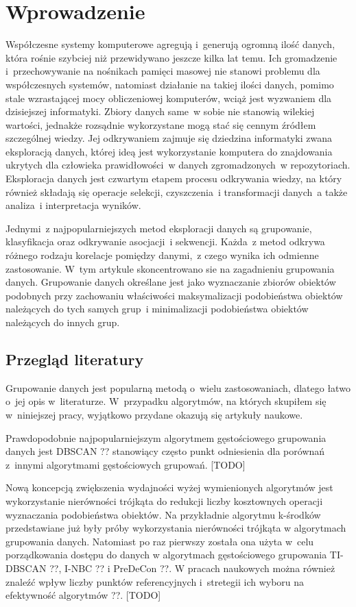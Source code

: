 \chapter{Wprowadzenie}

Współczesne systemy komputerowe agregują i~generują ogromną ilość danych, która rośnie szybciej niż przewidywano jeszcze kilka lat temu. Ich gromadzenie i~przechowywanie na nośnikach pamięci masowej nie stanowi problemu dla współczesnych systemów, natomiast działanie na takiej ilości danych, pomimo stale wzrastającej mocy obliczeniowej komputerów, wciąż jest wyzwaniem dla dzisiejszej informatyki. Zbiory danych same~w sobie nie stanowią wilekiej wartości, jednakże rozsądnie wykorzystane mogą stać się cennym źródłem szczególnej wiedzy. Jej odkrywaniem zajmuje się dziedzina informatyki zwana eksploracją danych, której ideą jest wykorzystanie komputera do znajdowania ukrytych dla człowieka prawidłowości~w danych zgromadzonych~w repozytoriach. Eksploracja danych jest czwartym etapem procesu odkrywania wiedzy, na który również składają się operacje selekcji, czyszczenia~i transformacji danych~a także analiza~i interpretacja wyników.

Jednymi~z najpopularniejszych metod eksploracji danych są grupowanie, klasyfikacja oraz odkrywanie asocjacji~i sekwencji. Każda~z metod odkrywa różnego rodzaju korelacje pomiędzy danymi,~z czego wynika ich odmienne zastosowanie. W~tym artykule skoncentrowano sie na zagadnieniu grupowania danych. Grupowanie danych określane jest jako wyznaczanie zbiorów obiektów podobnych przy zachowaniu właściwości maksymalizacji podobieństwa obiektów należących do tych samych grup~i minimalizacji podobieństwa obiektów należących do innych grup.

\section[Przegląd literatury][Przegląd literatury]{Przegląd literatury}

Grupowanie danych jest popularną metodą o~wielu zastosowaniach, dlatego łatwo o~jej opis w~literaturze. W~przypadku algorytmów, na których skupiłem się w~niniejszej pracy, wyjątkowo przydane okazują się artykuły naukowe.

Prawdopodobnie najpopularniejszym algorytmem gęstościowego grupowania danych jest DBSCAN ?? stanowiący często punkt odniesienia dla porównań z~innymi algorytmami gęstościowych grupowań. [TODO]

Nową koncepcją zwiększenia wydajności wyżej wymienionych algorytmów jest wykorzystanie nierówności trójkąta do redukcji liczby kosztownych operacji wyznaczania podobieństwa obiektów. Na przykładnie algorytmu k-środków przedstawiane już były próby wykorzystania nierówności trójkąta w algorytmach grupowania danych. Natomiast po raz pierwszy została ona użyta w~celu porządkowania dostępu do danych w algorytmach gęstościowego grupowania TI-DBSCAN ??, I-NBC ?? i PreDeCon ??. W pracach naukowych można również znaleźć wpływ liczby punktów referencyjnych i~stretegii ich wyboru na efektywność algorytmów ??. [TODO]

